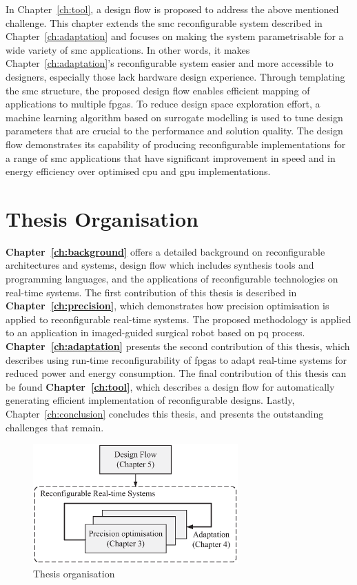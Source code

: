 In Chapter~\ref{ch:tool}, a design flow is proposed to address the above mentioned challenge.
This chapter extends the \gls{smc} reconfigurable system described in Chapter~\ref{ch:adaptation} and focuses on making the system parametrisable for a wide variety of \gls{smc} applications.
In other words, it makes Chapter~\ref{ch:adaptation}'s reconfigurable system easier and more accessible to designers, especially those lack hardware design experience.
Through templating the \gls{smc} structure, the proposed design flow enables efficient mapping of applications to multiple \glspl{fpga}.
To reduce design space exploration effort, a machine learning algorithm based on surrogate modelling is used to tune design parameters that are crucial to the performance and solution quality.
The design flow demonstrates its capability of producing reconfigurable implementations for a range of \gls{smc} applications that have significant improvement in speed and in energy efficiency over optimised \gls{cpu} and \gls{gpu} implementations.


\section{Thesis Organisation}

\textbf{Chapter~\ref{ch:background}} offers a detailed background on reconfigurable architectures and systems, design flow which includes synthesis tools and programming languages, and the applications of reconfigurable technologies on real-time systems.
The first contribution of this thesis is described in \textbf{Chapter~\ref{ch:precision}}, which demonstrates how precision optimisation is applied to reconfigurable real-time systems.
The proposed methodology is applied to an application in imaged-guided surgical robot based on \gls{pq} process. 
\textbf{Chapter~\ref{ch:adaptation}} presents the second contribution of this thesis, which describes using run-time reconfigurability of \glspl{fpga} to adapt real-time systems for reduced power and energy consumption.
The final contribution of this thesis can be found \textbf{Chapter~\ref{ch:tool}}, which describes a design flow for automatically generating efficient implementation of reconfigurable designs.
Lastly, Chapter~\ref{ch:conclusion} concludes this thesis, and presents the outstanding challenges that remain.

\begin{figure}[ht]
\begin{center}
\includegraphics[width=0.7\textwidth]{1_introduction/figures/organisation}
\end{center}
\caption{Thesis organisation}
\label{fig:intro_organisation}
\end{figure}

